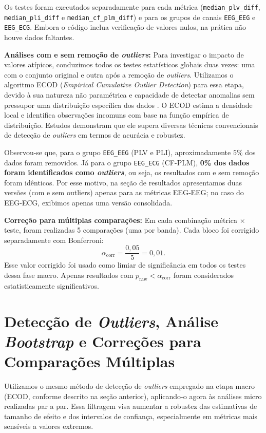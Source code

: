 Os testes foram executados separadamente para cada métrica (\texttt{median\_plv\_diff}, \texttt{median\_pli\_diff} e \texttt{median\_cf\_plm\_diff}) e para os grupos de canais \texttt{EEG\_EEG} e \texttt{EEG\_ECG}. Embora o código inclua verificação de valores nulos, na prática não houve dados faltantes.

\noindent\textbf{Análises com e sem remoção de \textit{outliers}:} Para investigar o impacto de valores atípicos, conduzimos todos os testes estatísticos globais duas vezes: uma com o conjunto original e outra após a remoção de \textit{outliers}. Utilizamos o algoritmo ECOD (\textit{Empirical Cumulative Outlier Detection}) para essa etapa, devido à sua natureza não paramétrica e capacidade de detectar anomalias sem pressupor uma distribuição específica dos dados \cite{li2022ecod}. O ECOD estima a densidade local e identifica observações incomuns com base na função empírica de distribuição. Estudos demonstram que ele supera diversas técnicas convencionais de detecção de \textit{outliers} em termos de acurácia e robustez.

Observou-se que, para o grupo \texttt{EEG\_EEG} (PLV e PLI), aproximadamente \(5\%\) dos dados foram removidos. Já para o grupo \texttt{EEG\_ECG} (CF-PLM), \textbf{0\% dos dados foram identificados como \textit{outliers}}, ou seja, os resultados com e sem remoção foram idênticos. Por esse motivo, na seção de resultados apresentamos duas versões (com e sem outliers) apenas para as métricas EEG‑EEG; no caso do EEG‑ECG, exibimos apenas uma versão consolidada.

\medskip
\noindent\textbf{Correção para múltiplas comparações:} Em cada combinação métrica × teste, foram realizadas 5 comparações (uma por banda). Cada bloco foi corrigido separadamente com Bonferroni:
\[
  \alpha_{\mathrm{corr}} = \frac{0{,}05}{5} = 0{,}01 .
\]
Esse valor corrigido foi usado como limiar de significância em todos os testes dessa fase macro. Apenas resultados com \(p_{\text{raw}} < \alpha_{\mathrm{corr}}\) foram considerados estatisticamente significativos.

\section{Detecção de \textit{Outliers}, Análise \textit{Bootstrap} e Correções para Comparações Múltiplas}
Utilizamos o mesmo método de detecção de \textit{outliers} empregado na etapa macro (ECOD, conforme descrito na seção anterior), aplicando-o agora às análises micro realizadas par a par. Essa filtragem visa aumentar a robustez das estimativas de tamanho de efeito e dos intervalos de confiança, especialmente em métricas mais sensíveis a valores extremos.

